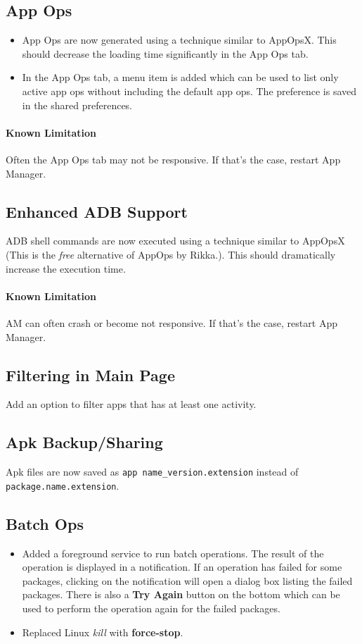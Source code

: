 \subsection{App Ops}
\begin{itemize}
    \item App Ops are now generated using a technique similar to AppOpsX. This should decrease the loading time
    significantly in the App Ops tab.
    \item In the App Ops tab, a menu item is added which can be used to list only active app ops without including the
    default app ops. The preference is saved in the shared preferences.
\end{itemize}

\paragraph{Known Limitation} Often the App Ops tab may not be responsive. If that's the case, restart App Manager.

\subsection{Enhanced ADB Support}
ADB shell commands are now executed using a technique similar to AppOpsX (This is the \textit{free} alternative of AppOps by Rikka.).
This should dramatically increase the execution time.

\paragraph{Known Limitation} AM can often crash or become not responsive. If that's the case, restart App Manager.

\subsection{Filtering in Main Page}
Add an option to filter apps that has at least one activity.

\subsection{Apk Backup/Sharing}
Apk files are now saved as \texttt{app name\_version.extension} instead of \texttt{package.name.extension}.

\subsection{Batch Ops}
\begin{itemize}
    \item Added a foreground service to run batch operations. The result of the operation is displayed in a notification.
    If an operation has failed for some packages, clicking on the notification will open a dialog box listing the failed
    packages. There is also a \textbf{Try Again} button on the bottom which can be used to perform the operation again for the failed packages.
    \item Replaced Linux \textit{kill} with \textbf{force-stop}.
\end{itemize}

